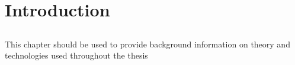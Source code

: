 \part{\label{part:intro}Introduction}
\thispagestyle{empty}
\null\clearpage

\chapter{\label{chp:Background}}

This chapter should be used to provide background information on theory and technologies used throughout the thesis



\tocless